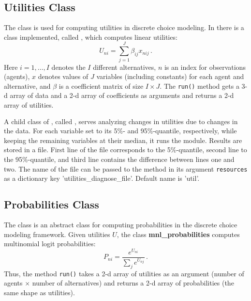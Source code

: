 \subsection{Utilities Class}
\label{sec:utilities}
The  class is used for computing utilities in
discrete choice modeling. In  there is a
 class implemented, called ,
which computes linear utilities:
\[
U_{ni} = \sum_{j=1}^J \beta_{ij}x_{nij}\,.
\]
Here $i=1,\dots,I$ denotes the $I$ different alternatives, $n$ is an index for
observations (agents), $x$ denotes values of $J$ variables (including
constants) for each agent and alternative, and $\beta$ is a coefficient matrix
of size $I\times J$. The \verb|run()| method gets a 3-d array of data and a
2-d array of coefficients as arguments and returns a 2-d array of utilities.

A child class of , called
, 
serves analyzing changes in utilities 
due to changes in the data. For each variable set to its 5\%- and 95\%-quantile, respectively, while keeping
the remaining variables at their median, it runs the  module. Results 
are stored in a file. First line of the file corresponds to the 5\%-quantile, second line to the 95\%-quantile,
and third line contains the difference between lines one and two. The name of the file 
can be passed to the  method in its argument \verb|resources| as a dictionary key
'utilities_diagnose_file'. Default name is 'util'.



\subsection{Probabilities Class}
\label{sec:probabilities}
 

The  class is an abstract class for computing
probabilities in the discrete choice modeling framework. Given
utilities $U$, the  class {\bf
mnl_probabilities} 
computes multinomial logit probabilities:
\[
P_{ni} = \frac{e^{U_{ni}}}{\sum_{j} e^{U_{nj}}}\,.
\]
Thus, the method \verb|run()| takes a 2-d array of utilities as an argument
(number of agents $\times$ number of alternatives) and returns a 2-d array of
probabilities (the same shape as utilities).

